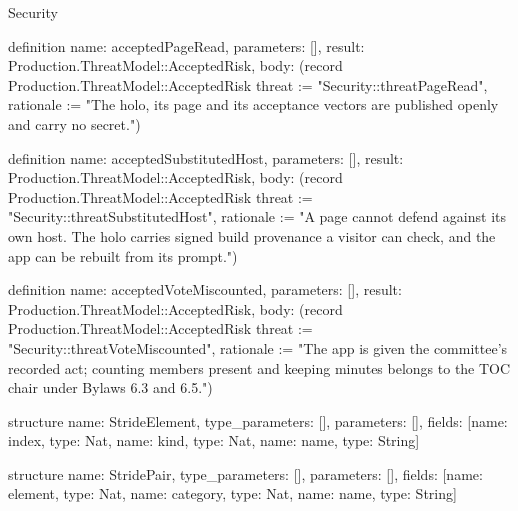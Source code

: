 \begin{lexlean}{Security}
\begin{semanticmodule}
definition{
  name: acceptedPageRead,
  parameters: [],
  result: Production.ThreatModel::AcceptedRisk,
  body: (record Production.ThreatModel::AcceptedRisk {threat := "Security::threatPageRead", rationale := "The holo, its page and its acceptance vectors are published openly and carry no secret."})
}

definition{
  name: acceptedSubstitutedHost,
  parameters: [],
  result: Production.ThreatModel::AcceptedRisk,
  body: (record Production.ThreatModel::AcceptedRisk {threat := "Security::threatSubstitutedHost", rationale := "A page cannot defend against its own host. The holo carries signed build provenance a visitor can check, and the app can be rebuilt from its prompt."})
}

definition{
  name: acceptedVoteMiscounted,
  parameters: [],
  result: Production.ThreatModel::AcceptedRisk,
  body: (record Production.ThreatModel::AcceptedRisk {threat := "Security::threatVoteMiscounted", rationale := "The app is given the committee's recorded act; counting members present and keeping minutes belongs to the TOC chair under Bylaws 6.3 and 6.5."})
}

structure{
  name: StrideElement,
  type_parameters: [],
  parameters: [],
  fields: [{name: index, type: Nat}, {name: kind, type: Nat}, {name: name, type: String}]
}

structure{
  name: StridePair,
  type_parameters: [],
  parameters: [],
  fields: [{name: element, type: Nat}, {name: category, type: Nat}, {name: name, type: String}]
}


\end{semanticmodule}
\end{lexlean}
